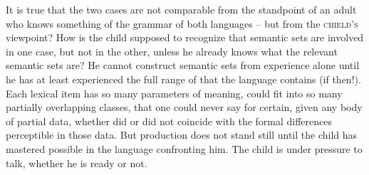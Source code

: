 It is true that the two cases are not comparable from the standpoint of an adult who knows something of the grammar of both languages -- but from the \textsc{chield's} viewpoint? How is the child supposed to recognize that semantic sets are involved in one case, but not in the other, unless he already knows what the relevant semantic sets are? He cannot construct semantic sets from experience alone until he has at least experienced the full range of  that the language contains (if then!). Each lexical item has so many parameters of mean\-ing, could fit into so many partially overlapping classes, that one could never say for certain, given any body of partial data, whether  did or did not coincide with the formal differences perceptible in those data. But production does not stand still until the child has mastered possible  in the language confronting him. The child is under pressure to talk, whether he is ready or not.

